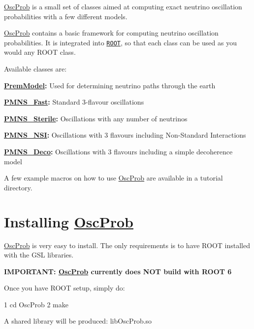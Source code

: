 \hyperlink{namespaceOscProb}{Osc\+Prob} is a small set of classes aimed at computing exact neutrino oscillation probabilities with a few different models.

\hyperlink{namespaceOscProb}{Osc\+Prob} contains a basic framework for computing neutrino oscillation probabilities. It is integrated into \href{https://root.cern.ch/}{\tt R\+O\+OT}, so that each class can be used as you would any R\+O\+OT class.

Available classes are\+:
\begin{DoxyItemize}
\item {\bfseries \hyperlink{classOscProb_1_1PremModel}{Prem\+Model}\+:} Used for determining neutrino paths through the earth
\item {\bfseries \hyperlink{classOscProb_1_1PMNS__Fast}{P\+M\+N\+S\+\_\+\+Fast}\+:} Standard 3-\/flavour oscillations
\item {\bfseries \hyperlink{classOscProb_1_1PMNS__Sterile}{P\+M\+N\+S\+\_\+\+Sterile}\+:} Oscillations with any number of neutrinos
\item {\bfseries \hyperlink{classOscProb_1_1PMNS__NSI}{P\+M\+N\+S\+\_\+\+N\+SI}\+:} Oscillations with 3 flavours including Non-\/\+Standard Interactions
\item {\bfseries \hyperlink{classOscProb_1_1PMNS__Deco}{P\+M\+N\+S\+\_\+\+Deco}\+:} Oscillations with 3 flavours including a simple decoherence model
\end{DoxyItemize}

A few example macros on how to use \hyperlink{namespaceOscProb}{Osc\+Prob} are available in a tutorial directory.

\section*{Installing \hyperlink{namespaceOscProb}{Osc\+Prob}}

\hyperlink{namespaceOscProb}{Osc\+Prob} is very easy to install. The only requirements is to have R\+O\+OT installed with the G\+SL libraries.

{\bfseries I\+M\+P\+O\+R\+T\+A\+NT\+: \hyperlink{namespaceOscProb}{Osc\+Prob} currently does N\+OT build with R\+O\+OT 6}

Once you have R\+O\+OT setup, simply do\+: 
\begin{DoxyCode}
1 cd OscProb
2 make
\end{DoxyCode}


A shared library will be produced\+: {\ttfamily lib\+Osc\+Prob.\+so}

